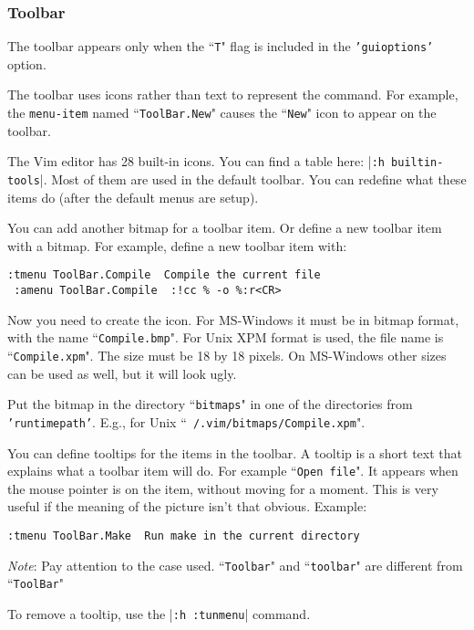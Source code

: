 \subsubsection{Toolbar}
The toolbar appears only when the ``\texttt{T}" flag is included in the \texttt{'guioptions'} option.

The toolbar uses icons rather than text to represent the command.
For example, the \texttt{{menu-item}} named ``\texttt{ToolBar.New}" causes the ``\texttt{New}" icon to appear on the toolbar.

The Vim editor has 28 built-in icons.
You can find a table here: |\texttt{:h builtin-tools}|.
Most of them are used in the default toolbar.
You can redefine what these items do (after the default menus are setup).

You can add another bitmap for a toolbar item.
Or define a new toolbar item with a bitmap.
For example, define a new toolbar item with:

\begin{Verbatim}[samepage=true]
 :tmenu ToolBar.Compile  Compile the current file
 :amenu ToolBar.Compile  :!cc % -o %:r<CR>
\end{Verbatim}

Now you need to create the icon.
For MS-Windows it must be in bitmap format, with the name ``\texttt{Compile.bmp}".
For Unix XPM format is used, the file name is ``\texttt{Compile.xpm}".
The size must be 18 by 18 pixels.
On MS-Windows other sizes can be used as well, but it will look ugly.

Put the bitmap in the directory ``\texttt{bitmaps}" in one of the directories from \texttt{'runtimepath'}.
E.g., for Unix ``\texttt{~/.vim/bitmaps/Compile.xpm}".

You can define tooltips for the items in the toolbar.
A tooltip is a short text that explains what a toolbar item will do.
For example ``\texttt{Open file}".
It appears when the mouse pointer is on the item, without moving for a moment.
This is very useful if the meaning of the picture isn't that obvious.
Example:

\begin{Verbatim}[samepage=true]
 :tmenu ToolBar.Make  Run make in the current directory
\end{Verbatim}
 
\emph{Note}: Pay attention to the case used.
``\texttt{Toolbar}" and ``\texttt{toolbar}" are different from ``\texttt{ToolBar}"

To remove a tooltip, use the |\texttt{:h :tunmenu}| command.

